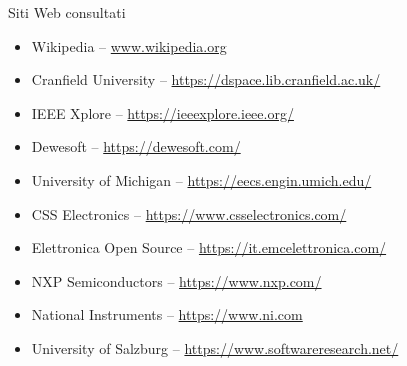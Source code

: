 \cleardoublepage
{}
{}
\nocite{*}


%

\vspace{2.5cm}
\begin{Large}Siti Web consultati\end{Large}
\begin{itemize}
    \item Wikipedia -- \url{www.wikipedia.org}
    \item Cranfield University -- \url{https://dspace.lib.cranfield.ac.uk/}
    \item IEEE Xplore -- \url{https://ieeexplore.ieee.org/}
    \item Dewesoft -- \url{https://dewesoft.com/}
    \item University of Michigan -- \url{https://eecs.engin.umich.edu/}
    \item CSS Electronics -- \url{https://www.csselectronics.com/}
    \item Elettronica Open Source -- \url{https://it.emcelettronica.com/}
    \item NXP Semiconductors -- \url{https://www.nxp.com/}
    \item National Instruments -- \url{https://www.ni.com}
    \item University of Salzburg -- \url{https://www.softwareresearch.net/}
\end{itemize}

